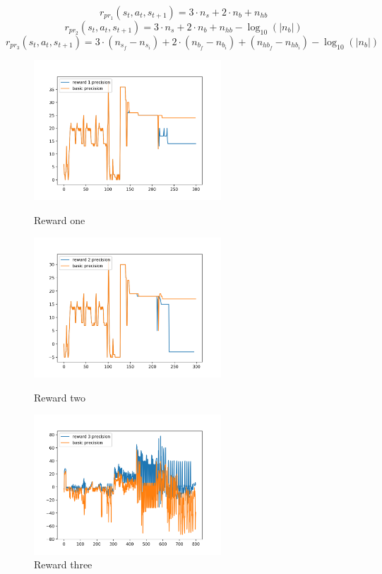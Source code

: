 \begin{equation}
		r_{pr_1}(s_t,a_t,s_{t+1}) = 3  \cdot n_s + 2 \cdot n_b + n_{hb}
\end{equation}
\begin{equation}
		r_{pr_2}(s_t,a_t,s_{t+1}) = 3  \cdot n_s + 2 \cdot n_b + n_{hb} - \log_{10}(|n_b|)
\end{equation}
\begin{equation}
		r_{pr_3}(s_t,a_t,s_{t+1}) = 3  \cdot (n_{s_f} - n_{s_i}) + 2 \cdot (n_{b_f} - n_{b_i}) + (n_{hb_f} - n_{hb_i}) - \log_{10}(|n_b|)
\end{equation}

\begin{figure}[!h]
  \includegraphics[width=7cm]{figures/r1}
  \caption{Reward one}\label{fig:r1}
\endminipage\hfill
{}
  \includegraphics[width=7cm]{figures/r2}
  \caption{Reward two}\label{fig:r2}
\endminipage\hfill
{}%
  \includegraphics[width=7cm]{figures/r3}
  \caption{Reward three}\label{fig:r3}
\endminipage
\end{figure}
\mbox{}\\ \mbox{}\\


